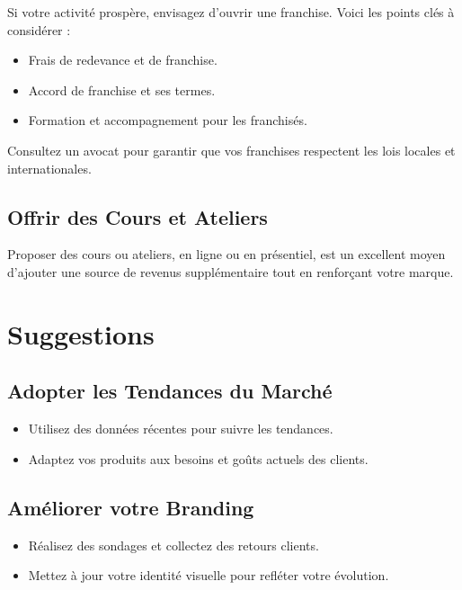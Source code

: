 \documentclass[11pt,fleqn,onecolumn,oneside]{book}
\begin{document}
Si votre activité prospère, envisagez d’ouvrir une franchise. Voici les points clés à considérer :
\begin{itemize}
    \item Frais de redevance et de franchise.
    \item Accord de franchise et ses termes.
    \item Formation et accompagnement pour les franchisés.
\end{itemize}

\begin{remark}
Consultez un avocat pour garantir que vos franchises respectent les lois locales et internationales.
\end{remark}

\subsection*{Offrir des Cours et Ateliers}

Proposer des cours ou ateliers, en ligne ou en présentiel, est un excellent moyen d’ajouter une source de revenus supplémentaire tout en renforçant votre marque.

\section{Suggestions}

\subsection*{Adopter les Tendances du Marché}

\begin{itemize}
    \item Utilisez des données récentes pour suivre les tendances.
    \item Adaptez vos produits aux besoins et goûts actuels des clients.
\end{itemize}

\subsection*{Améliorer votre Branding}

\begin{itemize}
    \item Réalisez des sondages et collectez des retours clients.
    \item Mettez à jour votre identité visuelle pour refléter votre évolution.
\end{itemize}
\end{document}
